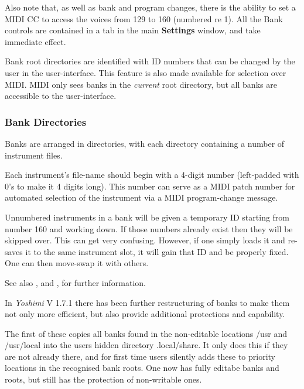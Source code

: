 %

   Also note that, as well as bank and program changes, there is the ability
   to set a MIDI CC to access the voices from 129 to 160 (numbered re 1).
   All the Bank controls are contained in a tab in the main
   \textbf{Settings} window, and take immediate effect.

   Bank root directories are identified with ID numbers that can be changed
   by the user in the user-interface. This feature is also made available for
   selection over MIDI.  MIDI only sees banks in the \textsl{current} root
   directory, but all banks are accessible to the user-interface.

\subsubsection{Bank Directories}
\label{subsubsec:banks_and_roots_bank_directories}

   Banks are arranged in directories, with each directory containing a number
   of instrument files.

   Each instrument's file-name should begin with a 4-digit number
   (left-padded with 0's to make it 4 digits long).  This number can serve
   as a MIDI patch number for automated selection of the instrument via a
   MIDI program-change message.

   Unnumbered instruments in a bank will be given a temporary ID starting
   from number 160 and working down. If those numbers already exist then
   they will be skipped over. This can get very confusing. However, if one
   simply loads it and re-saves it to the same instrument slot, it will gain
   that ID and be properly fixed.  One can then move-swap it with others.

   See also , and
   , for further information.

   In \textsl{Yoshimi} V 1.7.1 there has been further restructuring of banks to
   make them not only more efficient, but also provide additional protections and
   capability.

   The first of these copies all banks found in the non-editable locations /usr
   and /usr/local into the users hidden directory .local/share. It only does this
   if they are not already there, and for first time users silently adds these to
   priority locations in the recognised bank roots. One now has fully editabe
   banks and roots, but still has the protection of non-writable ones.

